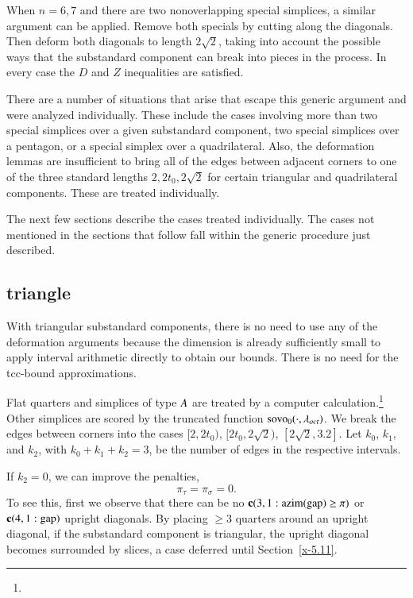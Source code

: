 When $n=6,7$ and there are two nonoverlapping special simplices, a
similar argument can be applied. Remove both specials by cutting along
the diagonals. Then deform both diagonals to length $2\sqrt{2}$, taking
into account the possible ways that the substandard component can break into pieces
in the process.  In every case the $D$ and $Z$ inequalities are
satisfied.

There are a number of situations that arise that escape this generic
argument and were analyzed individually. These include the cases
involving more than two special simplices over a given substandard component, two
special simplices over a pentagon, or a special simplex over a
quadrilateral.  Also, the deformation lemmas are insufficient to bring
all of the edges between adjacent corners to one of the three standard
lengths $2,2t_0,2\sqrt{2}$ for certain triangular and quadrilateral
components.  These are treated individually.

The next few sections describe the cases treated individually. The cases
not mentioned in the sections that follow fall within the generic
procedure just described.

\subsection{triangle} %

With triangular substandard components, there is no need to use any of the
deformation arguments because the dimension is already sufficiently
small to apply interval arithmetic directly to obtain our bounds.
There is no need for the tcc-bound approximations.

Flat quarters and simplices of type $A$ are treated by a computer
calculation.\footnote{} %
Other simplices are scored by the truncated function
${\operatorname{sovo}}_0(\cdot,\lambda_{oct})$. We break the edges between corners into the cases
    $[2,2t_0)$, $[2t_0,2\sqrt{2})$, $[2\sqrt{2},3.2]$.
Let $k_0$, $k_1$, and $k_2$, with $k_0+k_1+k_2=3$, be the number
of edges  in the respective intervals.

If $k_2=0$, we can improve the penalties,
    $$\pi_\tau = \pi_\sigma=0.$$
To see this, first we observe that there can be no ${\operatorname{\bf c}}{(3,1: {\operatorname{azim}}({\operatorname{gap}}) \ge \pi)}$ or
${\operatorname{\bf c}}{(4,1:{\operatorname{gap}})}$ upright diagonals. By placing $\ge3$ quarters around
an upright diagonal, if the substandard component is triangular, the upright
diagonal becomes surrounded by slices, a case deferred
until Section~\ref{x-5.11}.

